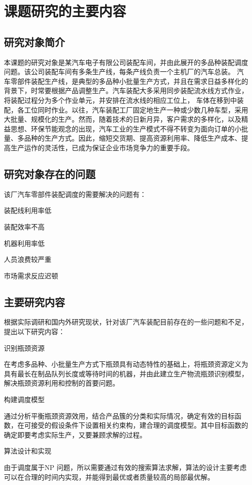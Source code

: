 
\chapter{课题研究的主要内容}
\section{研究对象简介}
本课题的研究对象是某汽车电子有限公司装配车间，并由此展开的多品种装配调度问题。该公司装配车间有多条生产线，每条产线负责一个主机厂的汽车总装。
汽车零部件装配生产线，是典型的多品种小批量生产方式，并且在需求日益多样化的背景下，时常要根据产品调整生产。汽车装配大多采用同步装配流水线方式作业，将装配过程分为多个作业单元，并安排在流水线的相应工位上，
车体在移到中装配，各工位同时作业。以往，汽车装配工厂固定地生产一种或少数几种车型，采用大批量、规模化的生产。然而，随着技术的日新月异，客户需求的多样化，以及精益思想、环保节能观念的出现，汽车工业的生产模式不得不转变为面向订单的小批量、多品种的生产方式。因此，缩短交货期、提高资源利用率、降低生产成本、提高生产运作的灵活性，已成为保证企业市场竞争力的重要手段。

\section{研究对象存在的问题}
该厂汽车零部件装配调度的需要解决的问题有：
\begin{asparaenum}[(1)]
\item 装配线利用率低
\item 装配效率不高
\item 机器利用率低
\item 人员浪费较严重
\item 市场需求反应迟顿
\end{asparaenum}

\section{主要研究内容}
根据实际调研和国内外研究现状，针对该厂汽车装配目前存在的一些问题和不足，提出以下研究内容：
\renewcommand{\labelenumi}{(\theenumi)}
\begin{asparaenum}
\item 识别瓶颈资源

在考虑多品种、小批量生产方式下瓶颈具有动态特性的基础上，将瓶颈资源定义为具有最长在制品队列长度或等待时间的机器，并由此建立生产物流瓶颈识别模型，解决瓶颈资源利用和控制的首要问题。
\item 构建调度模型

通过分析平衡瓶颈资源效用，结合产品簇的分类和实际情况，确定有效的目标函数，在可接受的假设条件下设置相关约束构，建合理的调度模型。其中目标函数的确定即要考虑实际生产，又要兼顾求解的过程。
\item 算法设计和实现
\end{asparaenum}

由于调度属于NP 问题，所以需要通过有效的搜索算法求解，算法的设计主要考虑可以在合理的时间内实现，并能得到最优或者质量较高的局部最优解。